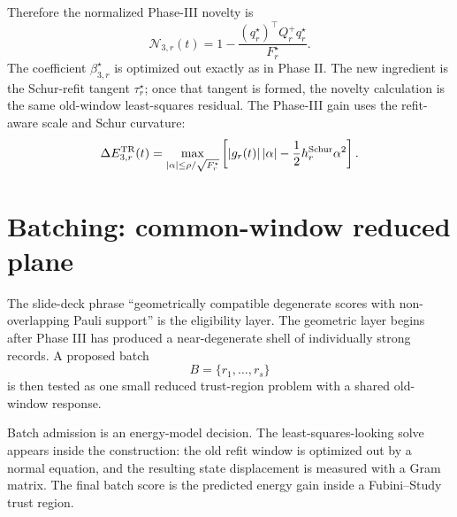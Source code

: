 \documentclass[10pt,twocolumn]{article}
\newcommand{\nov}{\mathcal N}
\begin{document}
Therefore the normalized Phase-III novelty is
\begin{equation}
\boxed{
\nov_{3,r}(t)=1-
\frac{(q_r^\star)^\top Q_r^+q_r^\star}{F_r^\star}.
}
\label{eq:p1_n3}
\end{equation}
The coefficient \(\beta_{3,r}^\star\) is optimized out exactly as in Phase II. The new ingredient is the Schur-refit tangent \(\tau_r^\star\); once that tangent is formed, the novelty calculation is the same old-window least-squares residual.
The Phase-III gain uses the refit-aware scale and Schur curvature:
\begin{equation}
\Delta E_{3,r}^{\rm TR}(t)=
\max_{|\alpha|\le\rho/\sqrt{F_r^\star}}
\left[|g_r(t)|\,|\alpha|-\frac12h_r^{\rm Schur}\alpha^2\right].
\label{eq:p1_phase3_gain}
\end{equation}

\section{Batching: common-window reduced plane}

The slide-deck phrase ``geometrically compatible degenerate scores with
non-overlapping Pauli support'' is the eligibility layer.  The geometric layer
begins after Phase III has produced a near-degenerate shell of individually
strong records.  A proposed batch
\[
B=\{r_1,\ldots,r_s\}
\]
is then tested as one small reduced trust-region problem with a shared
old-window response.

\begin{intuitionbox}
Batch admission is an energy-model decision.  The least-squares-looking solve
appears inside the construction: the old refit window is optimized out by a
normal equation, and the resulting state displacement is measured with a Gram
matrix.  The final batch score is the predicted energy gain inside a
Fubini--Study trust region.
\end{intuitionbox}
\end{document}
